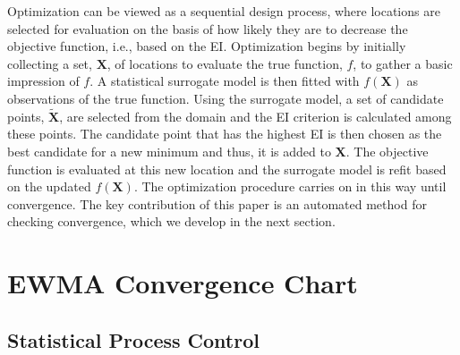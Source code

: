 \documentclass[12pt]{article}
\begin{document}
Optimization can be viewed as a sequential design process, where locations are selected for evaluation on the basis of how likely they are to decrease the objective function, i.e., based on the EI.
Optimization begins by initially collecting a set, $\bm{X}$, of locations to evaluate the true function, $f$, to gather a basic impression of $f$.
A statistical surrogate model is then fitted with $f(\bm{X})$ as observations of the true function.
Using the surrogate model, a set of candidate points, $\tilde{\bm{X}}$, are selected from the domain and the EI criterion is calculated among these points.
%
The candidate point that has the highest EI is then chosen as the best candidate for a new minimum and thus, it is added to $\bm{X}$.
The objective function is evaluated at this new location and the surrogate model is refit based on the updated $f(\bm{X})$.
%
The optimization procedure carries on in this way until convergence.  The key contribution of this paper is an automated method for checking convergence, which we develop in the next section. 

%
%
\section{EWMA Convergence Chart}
\label{sec:convergence}
%
%

%
%
\subsection{Statistical Process Control}
%
%
\end{document}
